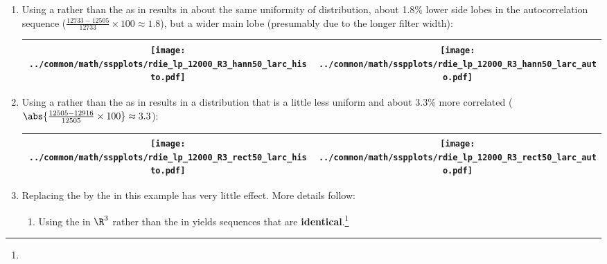 \begin{example}
\begin{enumerate}
  \item \label{item:rdie_lp_R3_hann50_larc}
        Using a   rather than the 
         as in 
        results in about the same uniformity of distribution, about 1.8\% lower side lobes in the autocorrelation sequence
        ($\frac{12733-12505}{12733}\times100\approx1.8$),
        but a wider main lobe (presumably due to the longer filter width):
     \\\begin{tabular}{|>{\scs}c|>{\scs}c|}
          \hline
          \texttt{[image: ../common/math/sspplots/rdie\_lp\_12000\_R3\_hann50\_larc\_histo.pdf]}%
         &\texttt{[image: ../common/math/sspplots/rdie\_lp\_12000\_R3\_hann50\_larc\_auto.pdf]}
        \\\hline
     \end{tabular}

  \item \label{item:rdie_lp_R3_rect50_larc}
        Using a  rather than the 
         as in 
        results in a distribution that is a little less uniform and about 3.3\% more correlated
        ($\abs{\frac{12505-12916}{12505}\times100}\approx3.3$):
     \\\begin{tabular}{|>{\scs}c|>{\scs}c|}
          \hline
          \texttt{[image: ../common/math/sspplots/rdie\_lp\_12000\_R3\_rect50\_larc\_histo.pdf]}%
         &\texttt{[image: ../common/math/sspplots/rdie\_lp\_12000\_R3\_rect50\_larc\_auto.pdf]}
        \\\hline
     \end{tabular}

  \item \label{item:rdie_lp_R3_euclid}
        Replacing the  by the  in this example
        has very little effect.
        More details follow:
    \begin{enumerate}
      \item Using the  in $\R^3$ rather than the  in 
            yields sequences that are \textbf{identical}.\footnote{}


\end{enumerate}
\end{enumerate}
\end{example}
